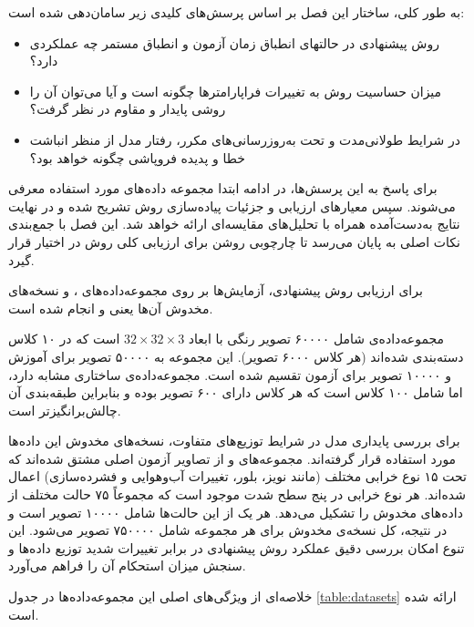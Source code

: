 به طور کلی، ساختار این فصل بر اساس پرسش‌های کلیدی زیر سامان‌دهی شده است:
\begin{itemize}
	\item روش پیشنهادی در حالتهای انطباق زمان آزمون و انطباق مستمر چه عملکردی دارد؟
	\item میزان حساسیت روش به تغییرات فراپارامترها چگونه است و آیا می‌توان آن را روشی پایدار و مقاوم در نظر گرفت؟
	\item در شرایط طولانی‌مدت و تحت به‌روزرسانی‌های مکرر، رفتار مدل از منظر انباشت خطا و پدیده فروپاشی چگونه خواهد بود؟
\end{itemize}

برای پاسخ به این پرسش‌ها، در ادامه ابتدا مجموعه داده‌های مورد استفاده معرفی می‌شوند. سپس معیارهای ارزیابی و جزئیات پیاده‌سازی روش تشریح شده و در نهایت نتایج به‌دست‌آمده همراه با تحلیل‌های مقایسه‌ای ارائه خواهد شد. این فصل با جمع‌بندی نکات اصلی به پایان می‌رسد تا چارچوبی روشن برای ارزیابی کلی روش در اختیار قرار گیرد.


برای ارزیابی روش پیشنهادی، آزمایش‌ها بر روی مجموعه‌داده‌های {،  }\cite{cifar10-100} و نسخه‌های مخدوش آن‌ها یعنی { و  }\cite{cifar10c-100c} انجام شده است. 

مجموعه‌داده‌ی  شامل ۶۰۰۰۰ تصویر رنگی با ابعاد $32\times32\times3$ است که در ۱۰ کلاس دسته‌بندی شده‌اند (هر کلاس ۶۰۰۰ تصویر). این مجموعه به ۵۰۰۰۰ تصویر برای آموزش و ۱۰۰۰۰ تصویر برای آزمون تقسیم شده است. مجموعه‌داده‌ی  ساختاری مشابه دارد، اما شامل ۱۰۰ کلاس است که هر کلاس دارای ۶۰۰ تصویر بوده و بنابراین طبقه‌بندی آن چالش‌برانگیزتر است. 

برای بررسی پایداری مدل در شرایط توزیع‌های متفاوت، نسخه‌های مخدوش این داده‌ها مورد استفاده قرار گرفته‌اند. مجموعه‌های  و  از تصاویر آزمون اصلی مشتق شده‌اند که تحت ۱۵ نوع خرابی مختلف (مانند نویز، {بلور‌}، تغییرات آب‌وهوایی و فشرده‌سازی) اعمال شده‌اند. هر نوع خرابی در پنج سطح شدت  موجود است که مجموعاً ۷۵ حالت مختلف از داده‌های مخدوش را تشکیل می‌دهد. هر یک از این حالت‌ها شامل ۱۰۰۰۰ تصویر است و در نتیجه، کل نسخه‌ی مخدوش برای هر مجموعه شامل ۷۵۰۰۰۰ تصویر می‌شود. این تنوع امکان بررسی دقیق عملکرد روش پیشنهادی در برابر تغییرات شدید توزیع داده‌ها و سنجش میزان استحکام آن را فراهم می‌آورد.  

خلاصه‌ای از ویژگی‌های اصلی این مجموعه‌داده‌ها در جدول \ref{table:datasets} ارائه شده است.  



